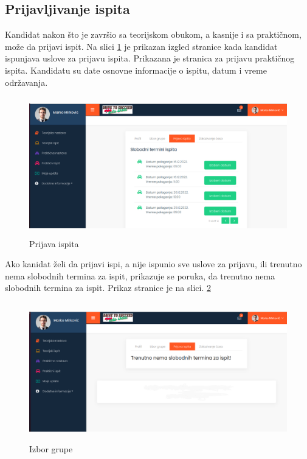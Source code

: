 \subsection{Prijavljivanje ispita}

Kandidat nakon što je završio sa teorijskom obukom, a kasnije i sa praktičnom, može da prijavi ispit. Na slici \ref{fig:ui_prijava_uspesna} je prikazan izgled stranice kada kandidat ispunjava uslove za prijavu ispita. Prikazana je stranica za prijavu praktičnog ispita. Kandidatu su date osnovne informacije o ispitu, datum i vreme održavanja.

\begin{figure}[H]
  \begin{center}
      \includegraphics[width=140mm, height=60mm]{UI/UI_prijava_ispita.png}
  \end{center}
  \caption {Prijava ispita}
  \label{fig:ui_prijava_uspesna}

\end{figure}


Ako kanidat želi da prijavi ispi, a nije ispunio sve uslove za prijavu, ili trenutno nema slobodnih termina za ispit, prikazuje se poruka, da trenutno nema slobodnih termina za ispit. Prikaz stranice je na slici. \ref{fig:ui_prijava2}

\begin{figure}[H]
  \begin{center}
      \includegraphics[width=140mm, height=60mm]{UI/UI_prijava_ispita2.png}
  \end{center}
  \caption {Izbor grupe}
  \label{fig:ui_prijava2}

\end{figure}
